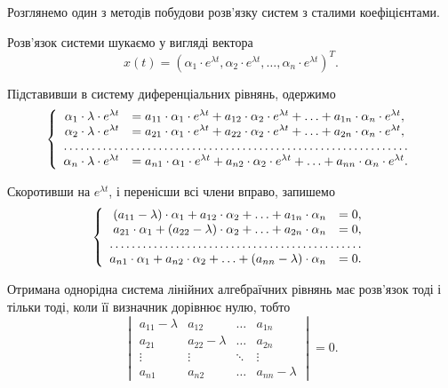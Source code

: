 Розглянемо один з методів побудови розв'язку систем з сталими коефіцієнтами. \parvskip

Розв'язок системи шукаємо у вигляді вектора \[x(t) = (\alpha_1 \cdot e^{\lambda t}, \alpha_2 \cdot e^{\lambda t}, \ldots, \alpha_n \cdot e^{\lambda t})^T. \]

Підставивши в систему диференціальних рівнянь, одержимо
\begin{equation*}
	\left\{
		\begin{array}{rl}
			\alpha_1 \cdot \lambda \cdot e^{\lambda t} &= a_{11} \cdot \alpha_1 \cdot e^{\lambda t} + a_{12} \cdot \alpha_2  \cdot e^{\lambda t} + \ldots + a_{1n} \cdot \alpha_n \cdot e^{\lambda t}, \\
			\alpha_2 \cdot \lambda \cdot e^{\lambda t} &= a_{21} \cdot \alpha_1 \cdot e^{\lambda t} + a_{22} \cdot \alpha_2 \cdot e^{\lambda t} + \ldots + a_{2n} \cdot \alpha_n \cdot e^{\lambda t}, \\
			\hdotsfor{2} \\
			\alpha_n \cdot \lambda \cdot e^{\lambda t} &= a_{n1} \cdot \alpha_1 \cdot e^{\lambda t} + a_{n2} \cdot \alpha_2 \cdot e^{\lambda t} + \ldots + a_{nn} \cdot \alpha_n \cdot e^{\lambda t}.
		\end{array}
	\right.
\end{equation*}
 
Скоротивши на $e^{\lambda t}$, і перенісши всі члени вправо, запишемо
\begin{equation*}
	\left\{
		\begin{array}{rl}
			(a_{11} - \lambda) \cdot \alpha_1 + a_{12} \cdot \alpha_2 + \ldots + a_{1n} \cdot \alpha_n &= 0, \\
			a_{21} \cdot \alpha_1 + (a_{22} - \lambda) \cdot \alpha_2 + \ldots + a_{2n} \cdot \alpha_n &= 0, \\
			\hdotsfor{2} \\
			a_{n1} \cdot \alpha_1 + a_{n2} \cdot \alpha_2 + \ldots + (a_{nn} - \lambda) \cdot \alpha_n &= 0.
		\end{array}
	\right.
\end{equation*}
 
Отримана однорідна система лінійних алгебраїчних рівнянь має роз\-в'яз\-ок тоді і тільки тоді, коли її визначник дорівнює нулю, тобто
\begin{equation*}
	\begin{vmatrix}
		a_{11} - \lambda & a_{12} & \ldots & a_{1n} \\
		a_{21} & a_{22} - \lambda & \ldots & a_{2n} \\
		\vdots & \vdots & \ddots & \vdots \\
		a_{n1} & a_{n2} & \ldots & a_{nn} - \lambda
	\end{vmatrix} = 0.
\end{equation*}

